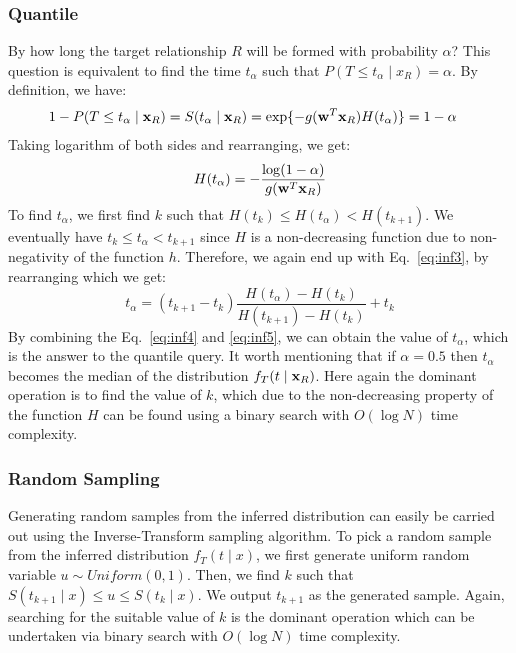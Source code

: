 \subsubsection{Quantile} By how long the target relationship $R$ will be formed with probability $\alpha$? This question is equivalent to find the time $t_\alpha$ such that $P(T \le t_\alpha\mid x_R)=\alpha$. By definition, we have:
\begin{equation*}
\begin{split}
1-P(T \le t_\alpha\mid \mathbf{x}_R)=S(t_\alpha\mid \mathbf{x}_R)&=\exp\{-g(\mathbf{w}^T\mathbf{x}_R){H}(t_\alpha)\}=1-\alpha
\end{split}
\end{equation*}
Taking logarithm of both sides and rearranging, we get:
\begin{equation}\label{eq:inf4}
{H}(t_\alpha)=-\frac{\log(1-\alpha)}{g(\mathbf{w}^T\mathbf{x}_R)}
\end{equation}
To find $t_\alpha$, we first find $k$ such that ${H}(t_k)\le{H}(t_\alpha)<{H}(t_{k+1})$.
We eventually have $t_k\le t_\alpha < t_{k+1}$ since $H$ is a non-decreasing function due to non-negativity of the function $h$. Therefore, we again end up with Eq.~\ref{eq:inf3}, by rearranging which we get:
\begin{equation}\label{eq:inf5}
t_\alpha=(t_{k+1}-t_k)\frac{{H}(t_\alpha)-{H}(t_k)}{{H}(t_{k+1})-{H}(t_k)}+t_k
\end{equation}
By combining the Eq.~\ref{eq:inf4} and \ref{eq:inf5}, we can obtain the value of $t_\alpha$, which is the answer to the quantile query. It worth mentioning that if $\alpha=0.5$ then $t_\alpha$ becomes the median of the distribution $f_T(t\mid \mathbf{x}_R)$. Here again the dominant operation is to find the value of $k$, which due to the non-decreasing property of the function ${H}$ can be found using a binary search with $O(\log N)$ time complexity.

\subsubsection{Random Sampling}
Generating random samples from the inferred distribution can easily be carried out using the Inverse-Transform sampling algorithm. To pick a random sample from the inferred distribution $f_T(t\mid x)$, we first generate uniform random variable $u\sim Uniform(0,1)$. Then, we find $k$ such that $S(t_{k+1}\mid x)\leq u\le S(t_k\mid x)$. We output $t_{k+1}$ as the generated sample. Again, searching for the suitable value of $k$ is the dominant operation which can be undertaken via binary search with $O(\log N)$ time complexity.

